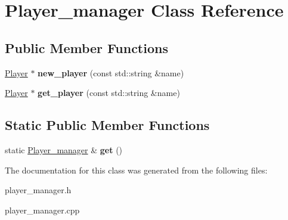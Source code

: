 \hypertarget{class_player__manager}{
\section{Player\_\-manager Class Reference}
\label{class_player__manager}
}
\subsection*{Public Member Functions}
\begin{DoxyCompactItemize}
\item 
\hypertarget{class_player__manager_a1e8951ad2bd1ddd41802be3a465b0ac9}{
\hyperlink{class_player}{Player} $\ast$ {\bfseries new\_\-player} (const std::string \&name)}
\label{class_player__manager_a1e8951ad2bd1ddd41802be3a465b0ac9}

\item 
\hypertarget{class_player__manager_a0fb7ff4761c5dfa7b8cbf9e1047785e9}{
\hyperlink{class_player}{Player} $\ast$ {\bfseries get\_\-player} (const std::string \&name)}
\label{class_player__manager_a0fb7ff4761c5dfa7b8cbf9e1047785e9}

\end{DoxyCompactItemize}
\subsection*{Static Public Member Functions}
\begin{DoxyCompactItemize}
\item 
\hypertarget{class_player__manager_a49331b0b59f172a1cf1aaecf2af9383e}{
static \hyperlink{class_player__manager}{Player\_\-manager} \& {\bfseries get} ()}
\label{class_player__manager_a49331b0b59f172a1cf1aaecf2af9383e}

\end{DoxyCompactItemize}


The documentation for this class was generated from the following files:\begin{DoxyCompactItemize}
\item 
player\_\-manager.h\item 
player\_\-manager.cpp\end{DoxyCompactItemize}
